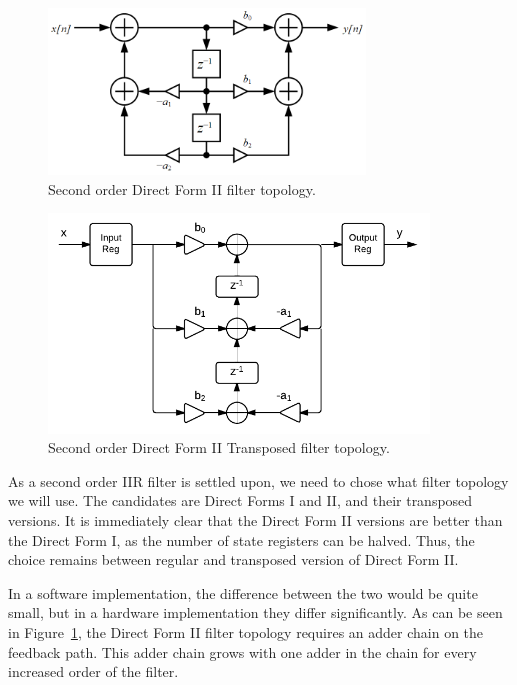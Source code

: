 \documentclass[]{article}
\begin{document}
\begin{figure}[btp]
	\begin{center}
		\includegraphics[width = 0.75\textwidth]{dfII.PNG}
	\end{center}
	\caption{Second order Direct Form II filter topology.}
	\label{fig:dfII}
\end{figure}

\begin{figure}[tbp]
	\begin{center}
		\includegraphics[width = 0.9\textwidth]{DirectFormIITransposed.pdf}
	\end{center}
	\caption{Second order Direct Form II Transposed filter topology.}
	\label{fig:df2t}
\end{figure}

As a second order IIR filter is settled upon, we need to chose what filter topology we will use. The candidates are Direct Forms I and II, and their transposed versions. It is immediately clear that the Direct Form II versions are better than the Direct Form I, as the number of state registers can be halved. Thus, the choice remains between regular and transposed version of Direct Form II.

In a software implementation, the difference between the two would be quite small, but in a hardware implementation they differ significantly. As can be seen in Figure~\ref{fig:dfII}, the Direct Form II filter topology requires an adder chain on the feedback path. This adder chain grows with one adder in the chain for every increased order of the filter.
\end{document}
